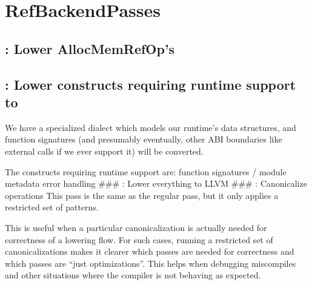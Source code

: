 \documentclass[letterpaper,10pt,english]{sphinxmanual}
\begin{document}
\section{RefBackendPasses}
\label{\detokenize{Pass_And_Transforms/index:refbackendpasses}}



\subsection{: Lower AllocMemRefOp’s}
\label{\detokenize{Pass_And_Transforms/index:lower-alloc-memref-ops-lower-allocmemrefop-s}}

\subsection{: Lower constructs requiring runtime support to }
\label{\detokenize{Pass_And_Transforms/index:lower-to-refbackrt-abi-lower-constructs-requiring-runtime-support-to-refbackrt}}
\sphinxAtStartPar
We have a specialized dialect  which models our runtime’s
data structures, and function signatures (and presumably eventually,
other ABI boundaries like external calls if we ever support it) will be
converted.

\sphinxAtStartPar
The constructs requiring runtime support are: \sphinxhyphen{} function signatures /
module metadata \sphinxhyphen{} error handling \#\#\# : Lower
everything to LLVM \#\#\# : Canonicalize
operations This pass is the same as the regular  pass,
but it only applies a restricted set of patterns.

\sphinxAtStartPar
This is useful when a particular canonicalization is actually needed for
correctness of a lowering flow. For such cases, running a restricted set
of canonicalizations makes it clearer which passes are needed for
correctness and which passes are “just optimizations”. This helps when
debugging miscompiles and other situations where the compiler is not
behaving as expected.
\end{document}

